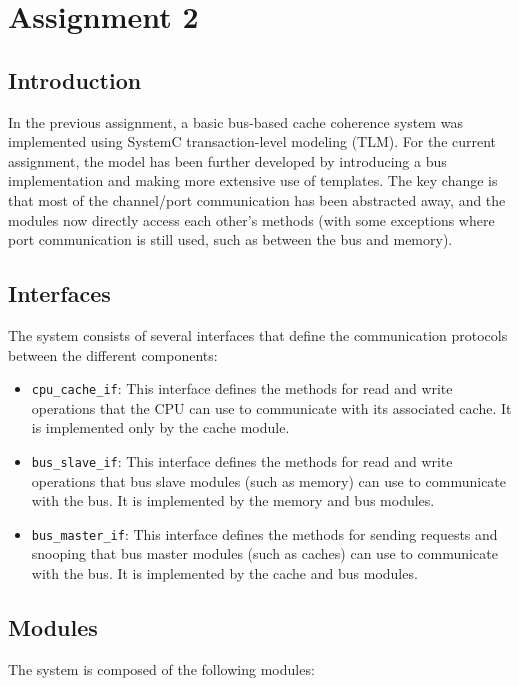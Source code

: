 \newpage
\section{Assignment 2}

\subsection{Introduction}
In the previous assignment, a basic bus-based cache coherence system was implemented using SystemC transaction-level modeling (TLM). For the current assignment, the model has been further developed by introducing a bus implementation and making more extensive use of templates. The key change is that most of the channel/port communication has been abstracted away, and the modules now directly access each other's methods (with some exceptions where port communication is still used, such as between the bus and memory).

\subsection{Interfaces}
The system consists of several interfaces that define the communication protocols between the different components:

\begin{itemize}
    \item \texttt{cpu\_cache\_if}: This interface defines the methods for read and write operations that the CPU can use to communicate with its associated cache. It is implemented only by the cache module.
    \item \texttt{bus\_slave\_if}: This interface defines the methods for read and write operations that bus slave modules (such as memory) can use to communicate with the bus. It is implemented by the memory and bus modules.
    \item \texttt{bus\_master\_if}: This interface defines the methods for sending requests and snooping that bus master modules (such as caches) can use to communicate with the bus. It is implemented by the cache and bus modules.
\end{itemize}

\subsection{Modules}
The system is composed of the following modules:


